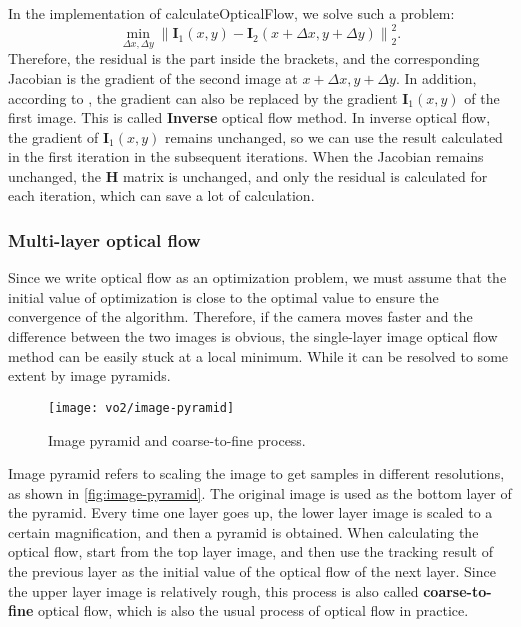 {In the implementation of calculateOpticalFlow, we solve such a problem:
\begin{equation}
\mathop {\min }\limits_{\Delta x,\Delta y} \left\| {{\bm{I}_1}\left( {x,y} \right) - {\bm{I}_2}\left( {x + \Delta x,y + \Delta y} \right)} \right\|_2^2.
\end{equation}
Therefore, the residual is the part inside the brackets, and the corresponding Jacobian is the gradient of the second image at $x + \Delta x,y + \Delta y$. In addition, according to \cite{Baker2004}, the gradient can also be replaced by the gradient $\bm{I}_1 (x,y)$ of the first image. This is called \textbf{Inverse} optical flow method. In inverse optical flow, the gradient of $\bm{I}_1 (x,y)$ remains unchanged, so we can use the result calculated in the first iteration in the subsequent iterations. When the Jacobian remains unchanged, the $\bm{H}$ matrix is unchanged, and only the residual is calculated for each iteration, which can save a lot of calculation.

\subsubsection{Multi-layer optical flow}
Since we write optical flow as an optimization problem, we must assume that the initial value of optimization is close to the optimal value to ensure the convergence of the algorithm. Therefore, if the camera moves faster and the difference between the two images is obvious, the single-layer image optical flow method can be easily stuck at a local minimum. While it can be resolved to some extent by image pyramids.

\begin{figure}[!htp]
	\centering
	\texttt{[image: vo2/image-pyramid]}
	\caption{Image pyramid and coarse-to-fine process.}
	\label{fig:image-pyramid}
\end{figure}

Image pyramid refers to scaling the image to get samples in different resolutions, as shown in \autoref{fig:image-pyramid}. The original image is used as the bottom layer of the pyramid. Every time one layer goes up, the lower layer image is scaled to a certain magnification, and then a pyramid is obtained. When calculating the optical flow, start from the top layer image, and then use the tracking result of the previous layer as the initial value of the optical flow of the next layer. Since the upper layer image is relatively rough, this process is also called \textbf{coarse-to-fine} optical flow, which is also the usual process of optical flow in practice.

}
